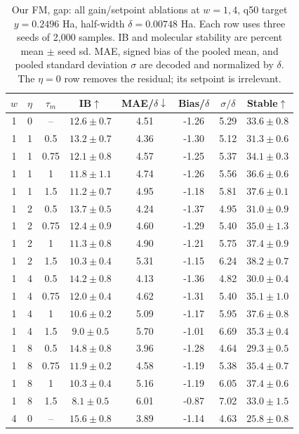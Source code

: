 \documentclass{article}
\begin{document}
\begin{table}[!htbp]
\centering\small
\caption{Our FM, gap: all gain/setpoint ablations at $w=1,4$, q50 target $y=0.2496$ Ha, half-width $\delta=0.00748$ Ha. Each row uses three seeds of 2,000 samples. IB and molecular stability are percent mean $\pm$ seed sd. MAE, signed bias of the pooled mean, and pooled standard deviation $\sigma$ are decoded and normalized by $\delta$. The $\eta=0$ row removes the residual; its setpoint is irrelevant.}
\label{tab:grid-fm-gap}
\begin{tabular}{cccccccc}
\toprule
$w$ & $\eta$ & $\tau_m$ & IB$\uparrow$ & MAE/$\delta\downarrow$ & Bias/$\delta$ & $\sigma/\delta$ & Stable$\uparrow$\\
\midrule
1 & 0 & -- & $12.6\pm0.7$ & 4.51 & -1.26 & 5.29 & $33.6\pm0.8$\\
1 & 1 & 0.5 & $13.2\pm0.7$ & 4.36 & -1.30 & 5.12 & $31.3\pm0.6$\\
1 & 1 & 0.75 & $12.1\pm0.8$ & 4.57 & -1.25 & 5.37 & $34.1\pm0.3$\\
1 & 1 & 1 & $11.8\pm1.1$ & 4.74 & -1.26 & 5.56 & $36.6\pm0.6$\\
1 & 1 & 1.5 & $11.2\pm0.7$ & 4.95 & -1.18 & 5.81 & $37.6\pm0.1$\\
1 & 2 & 0.5 & $13.7\pm0.5$ & 4.24 & -1.37 & 4.95 & $31.0\pm0.9$\\
1 & 2 & 0.75 & $12.4\pm0.9$ & 4.60 & -1.29 & 5.40 & $35.0\pm1.3$\\
1 & 2 & 1 & $11.3\pm0.8$ & 4.90 & -1.21 & 5.75 & $37.4\pm0.9$\\
1 & 2 & 1.5 & $10.3\pm0.4$ & 5.31 & -1.15 & 6.24 & $38.2\pm0.7$\\
1 & 4 & 0.5 & $14.2\pm0.8$ & 4.13 & -1.36 & 4.82 & $30.0\pm0.4$\\
1 & 4 & 0.75 & $12.0\pm0.4$ & 4.62 & -1.31 & 5.40 & $35.1\pm1.0$\\
1 & 4 & 1 & $10.6\pm0.2$ & 5.09 & -1.17 & 5.95 & $37.6\pm0.8$\\
1 & 4 & 1.5 & $9.0\pm0.5$ & 5.70 & -1.01 & 6.69 & $35.3\pm0.4$\\
1 & 8 & 0.5 & $14.8\pm0.8$ & 3.96 & -1.28 & 4.64 & $29.3\pm0.5$\\
1 & 8 & 0.75 & $11.9\pm0.2$ & 4.58 & -1.19 & 5.38 & $35.4\pm0.7$\\
1 & 8 & 1 & $10.3\pm0.4$ & 5.16 & -1.19 & 6.05 & $37.4\pm0.6$\\
1 & 8 & 1.5 & $8.1\pm0.5$ & 6.01 & -0.87 & 7.02 & $33.0\pm1.5$\\
\midrule
4 & 0 & -- & $15.6\pm0.8$ & 3.89 & -1.14 & 4.63 & $25.8\pm0.8$\\

\end{tabular}
\end{table}
\end{document}
